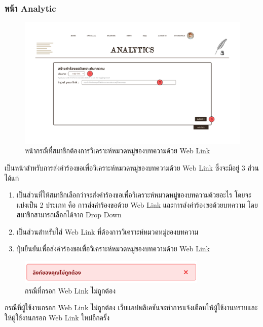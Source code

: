 \documentclass[12pt,oneside,openright,a4paper]{cpe-thai-project}
\begin{document}
\begin{itemize}
\subsubsection{หน้า Analytic}
\begin{figure}[!ht]\centering
  \includegraphics[width=16cm]{./img/project_ui/weblink_1.png} 
  \caption{หน้ากรณีที่สมาชิกต้องการวิเคราะห์หมวดหมู่ของบทความด้วย Web Link}\label{fig:ana_weblink} 
\end{figure}
\hspace*{1cm}เป็นหน้าสำหรับการส่งคำร้องขอเพื่อวิเคราะห์หมวดหมู่ของบทความด้วย Web Link ซึ่งจะมีอยู่ 3 ส่วน ได้แก่
\begin{enumerate}
  \item เป็นส่วนที่ให้สมาชิกเลือกว่าจะส่งคำร้องขอเพื่อวิเคราะห์หมวดหมู่ของบทความด้วยอะไร โดยจะแบ่งเป็น 2 ประเภท คือ 
        การส่งคำร้องขอด้วย Web Link และการส่งคำร้องขอด้วยบทความ โดยสมาชิกสามารถเลือกได้จาก Drop Down
  \item เป็นส่วนสำหรับใส่ Web Link ที่ต้องการวิเคราะห์หมวดหมู่ของบทความ
  \item ปุ่มยืนยันเพื่อส่งคำร้องขอเพื่อวิเคราะห์หมวดหมู่ของบทความด้วย Web Link
\end{enumerate}
\begin{figure}[!ht]\centering
  \includegraphics[width=9cm]{./img/project_ui/linkfail.png} 
  \caption{กรณีที่กรอก Web Link ไม่ถูกต้อง}\label{fig:linkfail} 
\end{figure}
\hspace*{1cm}กรณีที่ผู้ใช้งานกรอก Web Link ไม่ถูกต้อง เว็บแอปพลิเคชันจะทำการแจ้งเตือนให้ผู้ใช้งานทราบและให้ผู้ใช้งานกรอก Web Link ใหม่อีกครั้ง \newpage
\begin{figure}[!ht]\centering

\end{figure}
\end{itemize}
\end{document}
